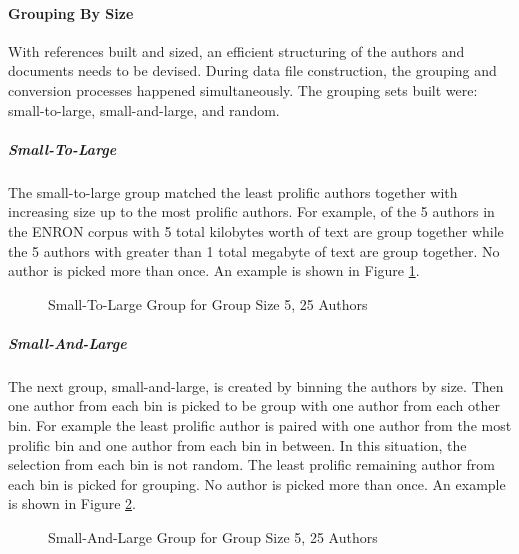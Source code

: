 	\paragraph{Grouping By Size} With references built and sized, an efficient structuring of the authors and documents needs to be devised.  During data file construction, the grouping and conversion processes happened simultaneously.  The grouping sets built were: small-to-large, small-and-large, and random.  
		\subparagraph{Small-To-Large} The small-to-large group matched the least prolific authors together with increasing size up to the most prolific authors.  For example, of the 5 authors in the ENRON corpus with 5 total kilobytes worth of text are group together while the 5 authors with greater than 1 total megabyte of text are group together.  No author is picked more than once.  An example is shown in Figure \ref{fig:smallToLargeGrouping}.
		\begin{figure}[h!]
			\begin{center}
				\caption{Small-To-Large Group for Group Size 5, 25 Authors}
				\label{fig:smallToLargeGrouping}
			\end{center}
		\end{figure}
		\subparagraph{Small-And-Large} The next group, small-and-large, is created by binning the authors by size.  Then one author from each bin is picked to be group with one author from each other bin.  For example the least prolific author is paired with one author from the most prolific bin and one author from each bin in between.  In this situation, the selection from each bin is not random.  The least prolific remaining author from each bin is picked for grouping.  No author is picked more than once. An example is shown in Figure \ref{fig:smallAndLargeGrouping}.
		\begin{figure}[h!]
			\begin{center}
				\caption{Small-And-Large Group for Group Size 5, 25 Authors}
				\label{fig:smallAndLargeGrouping}
			\end{center}
		\end{figure}
